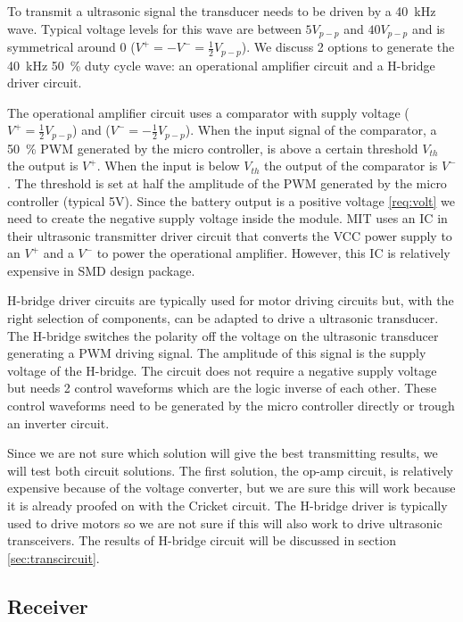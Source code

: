 To transmit a ultrasonic signal the transducer needs to be driven by a \SI{40}{\kilo\hertz} wave.
Typical voltage levels for this wave are between $5V_{p-p}$ and $40V_{p-p}$ and is symmetrical around 0 ($V^{+}=-V^{-}=\frac{1}{2}V_{p-p}$).
We discuss 2 options to generate the \SI{40}{\kilo\hertz} \SI{50}{\percent} duty cycle wave: an operational amplifier circuit and a H-bridge driver circuit.

The operational amplifier circuit uses a comparator with supply voltage ($V^{+}=\frac{1}{2}V_{p-p}$) and ($V^{-}=-\frac{1}{2}V_{p-p}$).
When the input signal of the comparator, a \SI{50}{\percent} PWM generated by the micro controller, is above a certain threshold $V_{th}$ the output is $V^{+}$.
When the input is below $V_{th}$ the output of the comparator is $V^{-}$.
The threshold is set at half the amplitude of the PWM generated by the micro controller (typical 5V).
Since the battery output is a positive voltage \ref{req:volt} we need to create the negative supply voltage inside the module.
MIT uses an IC in their ultrasonic transmitter driver circuit that converts the VCC power supply to an $V^{+}$ and a $V^{-}$ to power the operational amplifier.
However, this IC is relatively expensive in SMD design package.

H-bridge driver circuits are typically used for motor driving circuits but, with the right selection of components, can be adapted to drive a ultrasonic transducer.
The H-bridge switches the polarity off the voltage on the ultrasonic transducer generating a PWM driving signal.
The amplitude of this signal is the supply voltage of the H-bridge.
The circuit does not require a negative supply voltage but needs 2 control waveforms which are the logic inverse of each other.
These control waveforms need to be generated by the micro controller directly or trough an inverter circuit.

Since we are not sure which solution will give the best transmitting results, we will test both circuit solutions. The first solution, the op-amp circuit, is relatively expensive because of the voltage converter, but we are sure this will work because it is already proofed on with the Cricket circuit. The H-bridge driver is typically used to drive motors so we are not sure if this will also work to drive ultrasonic transceivers. The results of H-bridge circuit will be discussed in section \ref{sec:transcircuit}.

\subsection{Receiver}
\label{chap:receiver}

